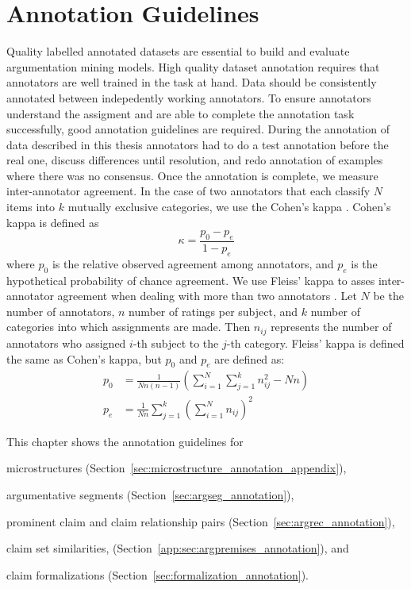 \chapter{Annotation Guidelines}
\label{chap:annotation_guidelines}

Quality labelled annotated datasets are essential to build and evaluate argumentation
mining models.  High quality dataset annotation requires that annotators are
well trained in the task at hand. 
Data should be consistently annotated between indepedently working annotators. 
To ensure annotators understand the assigment and are able to complete 
the annotation task successfully, good annotation guidelines are required. 
During the annotation of data described in this thesis  
annotators had to do a test annotation before the real one, 
discuss differences until resolution, and redo annotation of examples
where there was no consensus. 
Once the annotation is complete, we measure inter-annotator agreement. 
In the case of two annotators that each classify $N$ items into $k$ mutually
exclusive categories, we use the Cohen's kappa \citep{cohen1960coefficient}. 
Cohen's kappa is defined as
$$
\kappa = \frac{p_0 - p_e}{1 - p_e}
$$
where $p_0$ is the relative observed agreement among annotators, and 
$p_e$ is the hypothetical probability of chance agreement. 
We use Fleiss' kappa to asses inter-annotator agreement when dealing with more than
two annotators \citep{fleiss1993review}.
Let $N$ be the number of annotators, $n$ number of ratings per subject, and
$k$ number of categories into which assignments are made. Then $n_{ij}$ represents
the number of annotators who assigned $i$-th subject to the $j$-th category. 
Fleiss' kappa is defined the same as Cohen's kappa, but $p_0$ and $p_e$ are defined as:
\begin{align*}
p_0 &= \frac{1}{Nn(n-1)} \left( \sum_{i=1}^{N} \sum_{j=1}^{k} n_{ij}^2 - Nn \right) \\
p_e &= \frac{1}{Nn} \sum_{j=1}^{k} \left( \sum_{i=1}^{N} n_{ij} \right)^2
\end{align*}

This chapter shows the annotation guidelines for 
\begin{enumerate*}[label=(\arabic*)]
\item microstructures (Section~\ref{sec:microstructure_annotation_appendix}), 
\item argumentative segments (Section~\ref{sec:argseg_annotation}),
\item prominent claim and claim relationship pairs (Section~\ref{sec:argrec_annotation}),
\item claim set similarities, (Section~\ref{app:sec:argpremises_annotation}), and
\item claim formalizations (Section~\ref{sec:formalization_annotation}).
\end{enumerate*}











